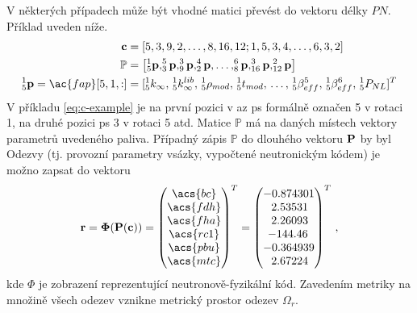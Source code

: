 V některých případech může být vhodné matici převést do vektoru 
délky $PN$. Příklad uveden níže.
\begin{align}
	\bv{c} &= [5, 3, 9, 2, \dots, 8, 16, 12; 1, 5, 3, 4, \dots, 6, 3, 2]\label{eq:c-example}\\
	\mathbb{P} &= \left[_5^1 \bv{p}, _3^5 \bv{p}, _9^3 \bv{p}, _2^4 \bv{p}, \dots, _8^6 \bv{p}, _{16}^3 \bv{p}, _{12}^2 \bv{p}\right]\label{eq:P-example}\\
	_5^1 \bv{p} = \ac{fap}[5,1,:] &= [_5^1 k_{\infty},\, _5^1 k_{\infty}^{lib},\,_5^1 \rho_{mod},\, _5^1 t_{mod},\, \dots,\, _5^1 \beta_{eff}^5,\,  _5^1 \beta_{eff}^6,\, _5^1 P_{NL}]^T
\end{align}
V příkladu \eqref{eq:c-example} je na první pozici v \ac{az} \ac{ps} formálně označen 5 v rotaci 1, na druhé 
pozici \ac{ps} 3 v rotaci 5 atd. Matice $\mathbb{P}$ má na daných místech vektory parametrů uvedeného paliva. 
Případný zápis $\mathbb{P}$ do dlouhého vektoru $\mathbf{P}$ by byl
Odezvy (tj. provozní parametry vsázky, vypočtené neutronickým kódem) je možno zapsat do vektoru 
\begin{align}
	\bv{r} = \bv{\Phi(P(c))} = \begin{pmatrix}
		\acs{bc}\\
		\acs{fdh}\\
		\acs{fha}\\
		\acs{rc1}\\ 
		\acs{pbu}\\
		\acs{mtc} 
	\end{pmatrix}^T 
	= \begin{pmatrix}
		-0.874301\\
		\,2.53531\\
		\,2.26093\\
		-144.46\,\\
		-0.364939\\
		\,2.67224
	\end{pmatrix}^T\,,
\end{align}
kde $\Phi$ je zobrazení reprezentující neutronově-fyzikální kód. Zavedením metriky na množině všech odezev vznikne metrický prostor 
odezev $\Omega_r$.

